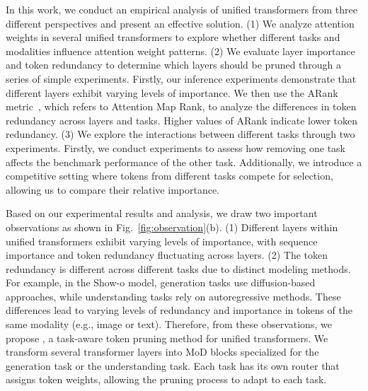 In this work, we conduct an empirical analysis of unified transformers from three different perspectives and present an effective solution. (1) We analyze attention weights in several unified transformers to explore whether different tasks and modalities influence attention weight patterns. (2) We evaluate layer importance and token redundancy to determine which layers should be pruned through a series of simple experiments. Firstly, our inference experiments demonstrate that different layers exhibit varying levels of importance. We then use the ARank metric~\cite{gamma-mod}, which refers to Attention Map Rank, to analyze the differences in token redundancy across layers and tasks. Higher values of ARank indicate lower token redundancy. (3) We explore the interactions between different tasks through two experiments. Firstly, we conduct experiments to assess how removing one task affects the benchmark performance of the other task. Additionally, we introduce a competitive setting where tokens from different tasks compete for selection, allowing us to compare their relative importance.


Based on our experimental results and analysis, we draw two important observations as shown in Fig.~\ref{fig:observation}(b). (1) Different layers within unified transformers exhibit varying levels of importance, with sequence importance and token redundancy fluctuating across layers.  (2) The token redundancy is different across different tasks due to distinct modeling methods. For example, in the Show-o model, generation tasks use diffusion-based approaches, while understanding tasks rely on autoregressive methods. These differences lead to varying levels of redundancy and importance in tokens of the same modality (e.g., image or text). Therefore, from these observations, we propose \method{}, a task-aware token pruning method for unified transformers. We transform several transformer layers into MoD blocks specialized for the generation task or the understanding task. Each task has its own router that assigns token weights, allowing the pruning process to adapt to each task. 


